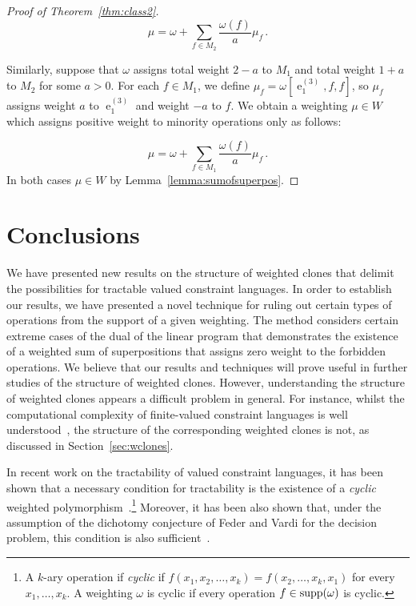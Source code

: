 \documentclass[11pt, reqno]{article}
\DeclareMathOperator{\proj}{\ensuremath{e}}
\DeclareMathOperator{\supp}{{\rm supp}}
\theoremstyle{remark}
\begin{document}
\begin{proof}[Proof of Theorem~\ref{thm:class2}]
  \begin{equation}
    \mu = \omega + \sum_{f \in M_2}\frac{\omega(f)}{a}\mu_f\,.
  \end{equation}

  Similarly, suppose that $\omega$ assigns total weight $2-a$ to $M_1$ and total
  weight $1+a$ to $M_2$ for some $a>0$.
  For each $f\in M_1$, we define $\mu_f=\omega[\proj^{(3)}_1,f,f]$, so $\mu_f$
  assigns weight $a$ to $\proj^{(3)}_1$ and weight $-a$ to $f$. We obtain a
  weighting $\mu \in W$ which assigns positive weight to minority operations
  only as follows:

  \begin{equation}
    \mu = \omega + \sum_{f \in M_1}\frac{\omega(f)}{a}\mu_f\,.
  \end{equation}
  In both cases $\mu\in W$ by Lemma~\ref{lemma:sumofsuperpos}.
\end{proof}






\section{Conclusions}

We have presented new results on the structure of weighted clones that delimit
the possibilities for tractable valued constraint languages. In order to
establish our results, we have presented a novel technique for ruling out
certain types of operations from the support of a given weighting. The method
considers certain extreme cases of the dual of the linear program that
demonstrates the existence of a weighted sum of superpositions that assigns zero
weight to the forbidden operations. We believe that our results and techniques
will prove useful in further studies of the structure of weighted clones.
However, understanding the structure of weighted clones appears a difficult
problem in
general. For instance, whilst the computational complexity of finite-valued
constraint languages is well understood~\cite{tz13:stoc}, the structure of the
corresponding weighted clones is not, as discussed in Section~\ref{sec:wclones}.

In recent work on the tractability of valued constraint languages, it has been
shown that a necessary condition for tractability is the existence of a
\emph{cyclic} weighted polymorphism~\cite{Kozik15:icalp}.\footnote{A $k$-ary
operation if \emph{cyclic} if $f(x_1,x_2,\ldots,x_k)=f(x_2,\ldots,x_k,x_1)$ for
every $x_1,\ldots,x_k$. A weighting $\omega$ is cyclic if every operation
$f\in\supp(\omega)$ is cyclic.} Moreover, it has been also shown that, under the
assumption of the dichotomy conjecture of Feder and Vardi for the decision
problem, this condition is
also sufficient~\cite{Kolmogorov15:general-valued}.
\end{document}

